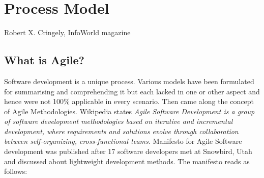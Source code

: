 \chapter{Process Model}
\begin{epigraphs}
        {Robert X. Cringely, InfoWorld magazine}
\end{epigraphs}
\section {What is Agile?}
Software development is a unique process. Various models have been formulated for summarising and comprehending it but each lacked in one or other aspect and hence were not 100\% applicable in every scenario. Then came along the concept of Agile Methodologies. Wikipedia states \emph{Agile Software Development is a group of software development methodologies based on iterative and incremental development, where requirements and solutions evolve through collaboration between self-organizing, cross-functional teams.} 
Manifesto for Agile Software development was published after 17 software developers met at Snowbird, Utah and discussed about lightweight development methods. The manifesto reads as follows:
